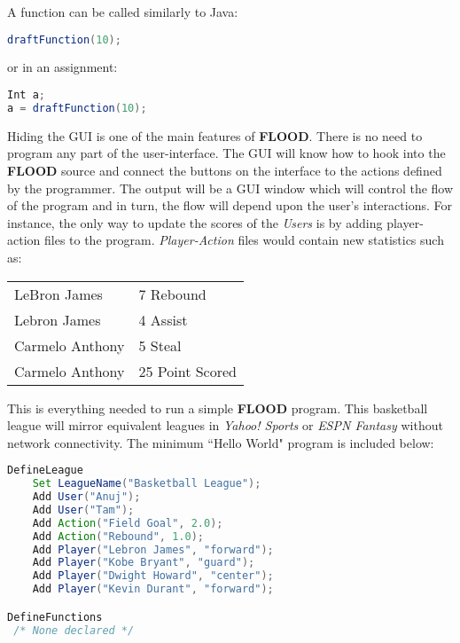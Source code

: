\documentclass[12pt]{report}
\begin{document}
A function can be called similarly to Java:

\begin{singlespace}
\begin{lstlisting}[language=Java,label=some-code,caption=Function call]
draftFunction(10);
\end{lstlisting}
\end{singlespace}

or in an assignment:

\begin{singlespace}
\begin{lstlisting}[language=Java,label=some-code,caption=Function call in an assignment]
Int a;
a = draftFunction(10);
\end{lstlisting}
\end{singlespace}

Hiding the GUI is one of the main features of \textbf{FLOOD}. There is no need to program any part of the user-interface. The GUI will know how to hook into the \textbf{FLOOD} source and connect the buttons on the interface to the actions defined by the programmer. The output will be a GUI window which will control the flow of the program and in turn, the flow will depend upon the user's interactions. For instance, the only way to update the scores of the \textit{Users} is by adding player-action files to the program. \textit{Player-Action} files would contain new statistics such as:
\begin{center}
\begin{singlespace}
\begin{tabular}{ l l }
LeBron James & 7 Rebound \\
Lebron James & 4 Assist \\
Carmelo Anthony & 5 Steal \\
Carmelo Anthony & 25 Point Scored
\end{tabular}
\end{singlespace}
\end{center}

This is everything needed to run a simple \textbf{FLOOD} program. This basketball league will mirror equivalent leagues in \textit{Yahoo! Sports} or \textit{ESPN Fantasy} without network connectivity. The minimum ``Hello World" program is included below:

\begin{singlespace}
\begin{lstlisting}[language=Java,label=some-code,caption=Minimal FLOOD program to create a basektball fantasy league]
DefineLeague
	Set LeagueName("Basketball League");
	Add User("Anuj");
	Add User("Tam");
	Add Action("Field Goal", 2.0);
	Add Action("Rebound", 1.0);
	Add Player("Lebron James", "forward");
	Add Player("Kobe Bryant", "guard");
	Add Player("Dwight Howard", "center");
	Add Player("Kevin Durant", "forward");

DefineFunctions
 /* None declared */
\end{lstlisting}
\end{singlespace}
\end{document}
